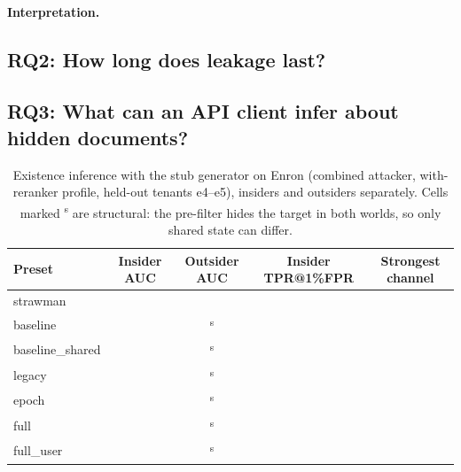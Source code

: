 \paragraph{Interpretation.}

\subsection{RQ2: How long does leakage last?}
\label{sec:rq2}

\subsection{RQ3: What can an API client infer about hidden documents?}
\label{sec:rq3}

\begin{table}[t]
\centering
\caption{Existence inference with the stub generator on Enron (combined attacker, with-reranker
profile, held-out tenants e4--e5), insiders and outsiders separately. Cells marked
\textsuperscript{s} are structural: the pre-filter hides the target in both worlds, so only shared
state can differ.}
\label{tab:rq3}
\footnotesize
\setlength{\tabcolsep}{3pt}
\begin{tabular}{@{}lcccc@{}}
\toprule
Preset & Insider AUC & Outsider AUC & Insider TPR@1\%FPR & Strongest channel \\
\midrule
strawman & \pending{} & \pending{} & \pending{} & \pending{} \\
baseline & \pending{} & \pending{}\textsuperscript{s} & \pending{} & \pending{} \\
baseline\_shared & \pending{} & \pending{}\textsuperscript{s} & \pending{} & \pending{} \\
legacy & \pending{} & \pending{}\textsuperscript{s} & \pending{} & \pending{} \\
epoch & \pending{} & \pending{}\textsuperscript{s} & \pending{} & \pending{} \\
full & \pending{} & \pending{}\textsuperscript{s} & \pending{} & \pending{} \\
full\_user & \pending{} & \pending{}\textsuperscript{s} & \pending{} & \pending{} \\
\bottomrule
\end{tabular}
\end{table}

